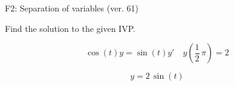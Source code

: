 \begin{exercise}
  \begin{exerciseTitle}F2: Separation of variables (ver. 61)\end{exerciseTitle}
  \begin{exerciseStatement}
    
Find the solution to the given IVP.

    
\[\cos\left(t\right) y= \sin\left(t\right) y'\hspace{1em} y\left( \frac{1}{2} \, \pi \right)= 2\]

  \end{exerciseStatement}
  \begin{exerciseAnswer}
    
\[y= 2 \, \sin\left(t\right)\]

  \end{exerciseAnswer}
\end{exercise}